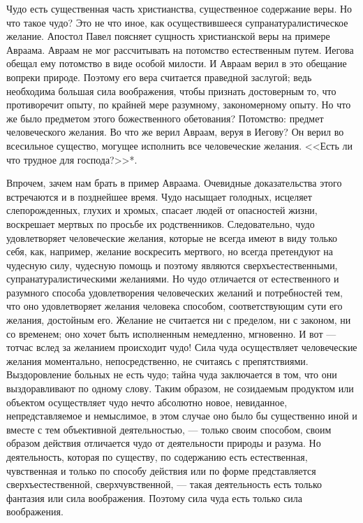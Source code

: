 \documentclass[12pt,oneside]{book}
\begin{document}
Чудо есть существенная часть христианства, существенное содержание веры. Но что такое чудо? Это не что иное, как осуществившееся супранатуралистическое желание. Апостол Павел поясняет сущность христианской веры на примере Авраама. Авраам не мог рассчитывать на потомство естественным путем. Иегова обещал ему потомство в виде особой милости. И Авраам верил в это обещание вопреки природе. Поэтому его вера считается праведной заслугой; ведь необходима большая сила воображения, чтобы признать достоверным то, что противоречит опыту, по крайней мере разумному, закономерному опыту. Но что же было предметом этого божественного обетования? Потомство: предмет человеческого желания. Во что же верил Авраам, веруя в Иегову? Он верил во всесильное существо, могущее исполнить все человеческие желания. <<Есть ли что трудное для господа?>>*\let\svthefootnote\thefootnote\let\thefootnote\relax{}\let\thefootnote\svthefootnote.



Впрочем, зачем нам брать в пример Авраама. Очевидные доказательства этого встречаются и в позднейшее время. Чудо насыщает голодных, исцеляет слепорожденных, глухих и хромых, спасает людей от опасностей жизни, воскрешает мертвых по просьбе их родственников. Следовательно, чудо удовлетворяет человеческие желания, которые не всегда имеют в виду только себя, как, например, желание воскресить мертвого, но всегда претендуют на чудесную силу, чудесную помощь и поэтому являются сверхъестественными, супранатуралистическими желаниями. Но чудо отличается от естественного и разумного способа удовлетворения человеческих желаний и потребностей тем, что оно удовлетворяет желания человека способом, соответствующим сути его желания, достойным его. Желание не считается ни с пределом, ни с законом, ни со временем; оно хочет быть исполненным немедленно, мгновенно. И вот --- тотчас вслед за желанием происходит чудо! Сила чуда осуществляет человеческие желания моментально, непосредственно, не считаясь с препятствиями. Выздоровление больных не есть чудо; тайна чуда заключается в том, что они выздоравливают по одному слову. Таким образом, не созидаемым продуктом или объектом осуществляет чудо нечто абсолютно новое, невиданное, непредставляемое и немыслимое, в этом случае оно было бы существенно иной и вместе с тем объективной деятельностью, --- только своим способом, своим образом действия отличается чудо от деятельности природы и разума. Но деятельность, которая по существу, по содержанию есть естественная, чувственная и только по способу действия или по форме представляется сверхъестественной, сверхчувственной, --- такая деятельность есть только фантазия или сила воображения. Поэтому сила чуда есть только сила воображения.
\end{document}

